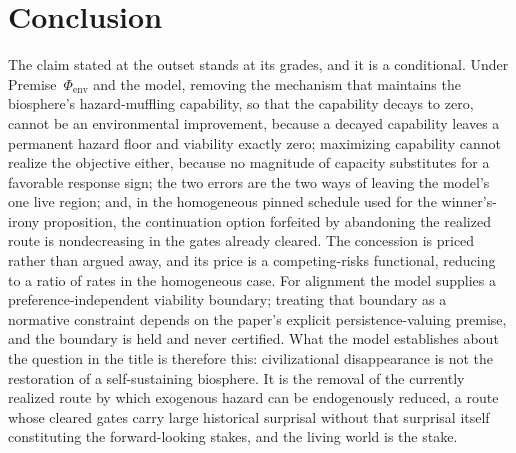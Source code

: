 \section{Conclusion}\label{sec:conclusion}

The claim stated at the outset stands at its grades, and it is a
conditional. Under Premise~$\Phi_{\mathrm{env}}$ and the model, removing
the mechanism that maintains the biosphere's hazard-muffling capability,
so that the capability decays to zero, cannot be an environmental
improvement, because a decayed capability leaves a permanent hazard
floor and viability exactly zero; maximizing capability cannot
realize the objective either, because no magnitude of capacity
substitutes for a favorable response sign; the two errors are the two
ways of leaving the model's one live region; and, in the homogeneous
pinned schedule used for the winner's-irony proposition, the
continuation option forfeited by abandoning the realized route is
nondecreasing in the gates already cleared. The concession is priced rather
than argued away, and its price is a competing-risks functional,
reducing to a ratio of rates in the homogeneous case. For alignment the
model supplies a preference-independent viability boundary; treating
that boundary as a normative constraint depends on the paper's explicit
persistence-valuing premise, and the boundary is held and never
certified. What the model
establishes about the question in the title is therefore this:
civilizational disappearance is not the restoration of a
self-sustaining biosphere. It is the removal of the currently realized
route by which exogenous hazard can be endogenously reduced, a route
whose cleared gates carry large historical surprisal without that
surprisal itself constituting the forward-looking stakes, and the living
world is the stake.

\printbibliography

